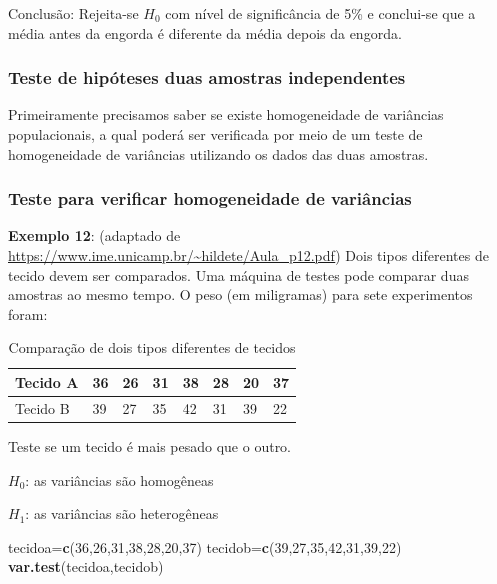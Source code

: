 \documentclass[12pt,brazil,oneside]{book}
\newenvironment{Shaded}{\begin{snugshade}}{\end{snugshade}}
\newcommand{\DecValTok}[1]{\textcolor[rgb]{0.00,0.00,0.81}{#1}}
\newcommand{\KeywordTok}[1]{\textcolor[rgb]{0.13,0.29,0.53}{\textbf{#1}}}
\newcommand{\NormalTok}[1]{#1}
\begin{document}
Conclusão: Rejeita-se \(H_0\) com nível de significância de 5\% e conclui-se que a média antes da engorda é diferente da média depois da engorda.

\hypertarget{teste-de-hipoteses-duas-amostras-independentes}{%
\subsubsection{Teste de hipóteses duas amostras independentes}\label{teste-de-hipoteses-duas-amostras-independentes}}

Primeiramente precisamos saber se existe homogeneidade de variâncias populacionais, a qual poderá ser verificada por meio de um teste de homogeneidade de variâncias utilizando os dados das duas amostras.

\hypertarget{teste-para-verificar-homogeneidade-de-variancias}{%
\subsubsection{Teste para verificar homogeneidade de variâncias}\label{teste-para-verificar-homogeneidade-de-variancias}}

\textbf{Exemplo 12}: (adaptado de \url{https://www.ime.unicamp.br/~hildete/Aula_p12.pdf}) Dois tipos diferentes de tecido devem ser comparados. Uma máquina de testes pode comparar duas amostras ao mesmo tempo. O peso (em miligramas) para sete experimentos foram:

\begin{table}[t]

\caption{\label{tab:unnamed-chunk-121}Comparação de dois tipos diferentes de tecidos}
\centering
\begin{tabular}{l|l|l|l|l|l|l|l}
\hline
Tecido A & 36 & 26 & 31 & 38 & 28 & 20 & 37\\
\hline
Tecido B & 39 & 27 & 35 & 42 & 31 & 39 & 22\\
\hline
\end{tabular}
\end{table}

Teste se um tecido é mais pesado que o outro.

\textbf{\(H_0\)}: as variâncias são homogêneas

\textbf{\(H_1\)}: as variâncias são heterogêneas

\begin{Shaded}
\begin{Highlighting}[]
\NormalTok{tecidoa=}\KeywordTok{c}\NormalTok{(}\DecValTok{36}\NormalTok{,}\DecValTok{26}\NormalTok{,}\DecValTok{31}\NormalTok{,}\DecValTok{38}\NormalTok{,}\DecValTok{28}\NormalTok{,}\DecValTok{20}\NormalTok{,}\DecValTok{37}\NormalTok{)}
\NormalTok{tecidob=}\KeywordTok{c}\NormalTok{(}\DecValTok{39}\NormalTok{,}\DecValTok{27}\NormalTok{,}\DecValTok{35}\NormalTok{,}\DecValTok{42}\NormalTok{,}\DecValTok{31}\NormalTok{,}\DecValTok{39}\NormalTok{,}\DecValTok{22}\NormalTok{)}
\KeywordTok{var.test}\NormalTok{(tecidoa,tecidob)}
\end{Highlighting}
\end{Shaded}
\end{document}
